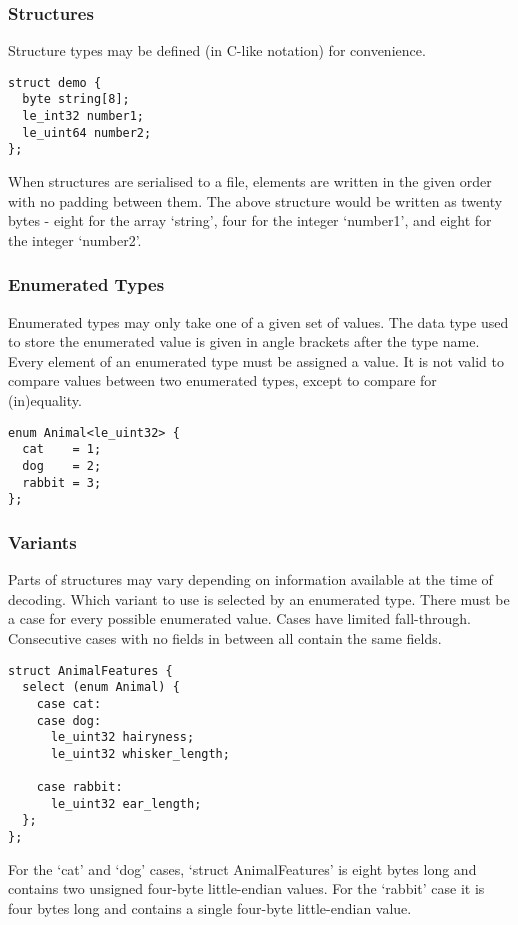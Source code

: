 \documentclass[10pt]{article}
\begin{document}
\subsubsection{Structures}
Structure types may be defined (in C-like notation) for convenience.

\begin{verbatim}
struct demo {
  byte string[8];
  le_int32 number1;
  le_uint64 number2;
};
\end{verbatim}

When structures are serialised to a file, elements are written in the given order with no padding between them.
The above structure would be written as twenty bytes - eight for the array `string', four for the integer `number1',
and eight for the integer `number2'.

\subsubsection{Enumerated Types}
Enumerated types may only take one of a given set of values.
The data type used to store the enumerated value is given in angle brackets after the type name.
Every element of an enumerated type must be assigned a value.
It is not valid to compare values between two enumerated types,
except to compare for (in)equality.

\begin{verbatim}
enum Animal<le_uint32> {
  cat    = 1;
  dog    = 2;
  rabbit = 3;
};
\end{verbatim}

\subsubsection{Variants}
Parts of structures may vary depending on information available at the time of decoding.
Which variant to use is selected by an enumerated type.
There must be a case for every possible enumerated value.
Cases have limited fall-through.
Consecutive cases with no fields in between all contain the same fields.

\begin{verbatim}
struct AnimalFeatures {
  select (enum Animal) {
    case cat:
    case dog:
      le_uint32 hairyness;
      le_uint32 whisker_length;

    case rabbit:
      le_uint32 ear_length;
  };
};
\end{verbatim}

For the `cat' and `dog' cases, `struct AnimalFeatures' is eight bytes long and contains two unsigned four-byte
little-endian values.
For the `rabbit' case it is four bytes long and contains a single four-byte little-endian value.
\end{document}
